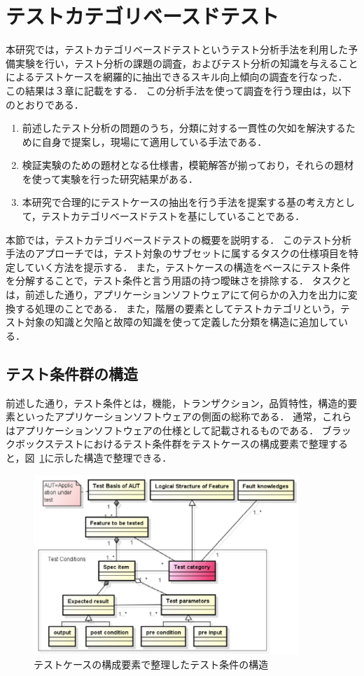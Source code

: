 \section{テストカテゴリベースドテスト}
本研究では，テストカテゴリベースドテスト\cite{yumoto2013test}というテスト分析手法を利用した予備実験を行い，テスト分析の課題の調査，およびテスト分析の知識を与えることによるテストケースを網羅的に抽出できるスキル向上傾向の調査を行なった．
この結果は３章に記載をする．
この分析手法を使って調査を行う理由は，以下のとおりである．
\begin{enumerate}
\item 前述したテスト分析の問題のうち，分類に対する一貫性の欠如を解決するために自身で提案し，現場にて適用している手法である．
\item 検証実験のための題材となる仕様書，模範解答が揃っており，それらの題材を使って実験を行った研究結果がある．
\item 本研究で合理的にテストケースの抽出を行う手法を提案する基の考え方として，テストカテゴリベースドテストを基にしていることである．
\end{enumerate}

本節では，テストカテゴリベースドテストの概要を説明する．
このテスト分析手法のアプローチでは，テスト対象のサブセットに属するタスクの仕様項目を特定していく方法を提示する．
また，テストケースの構造をベースにテスト条件を分解することで，テスト条件と言う用語の持つ曖昧さを排除する．
タスクとは，前述した通り，アプリケーションソフトウェアにて何らかの入力を出力に変換する処理のことである．
また，階層の要素としてテストカテゴリという，テスト対象の知識と欠陥と故障の知識を使って定義した分類を構造に追加している．

\subsection{テスト条件群の構造}
前述した通り，テスト条件とは，機能，トランザクション，品質特性，構造的要素といったアプリケーションソフトウェアの側面の総称である．
通常，これらはアプリケーションソフトウェアの仕様として記載されるものである．
ブラックボックステストにおけるテスト条件群をテストケースの構成要素で整理すると，図~\ref{fig:D-4-Fig4}に示した構造で整理できる．

\begin{figure}[htbp]
  \begin{center}
  \includegraphics[width=10cm]{./image/D-4-Fig4.png}
  \caption{テストケースの構成要素で整理したテスト条件の構造}
  \label{fig:D-4-Fig4}
  \end{center}
   \end{figure}

